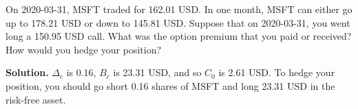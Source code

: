 \noindent On 2020-03-31, MSFT traded for 162.01 USD. In one month, MSFT can either go up to 178.21 USD or down to 145.81 USD. Suppose that on 2020-03-31, you went long a 150.95 USD call. What was the option premium that you paid or received? How would you hedge your position?

\vspace{9pt}

\noindent\textbf{Solution.} $\Delta_{c}$ is 0.16, $B_{c}$ is 23.31 USD, and so $C_{0}$ is 2.61 USD. To hedge your position, you should go short 0.16 shares of MSFT and long 23.31 USD in the risk-free asset.